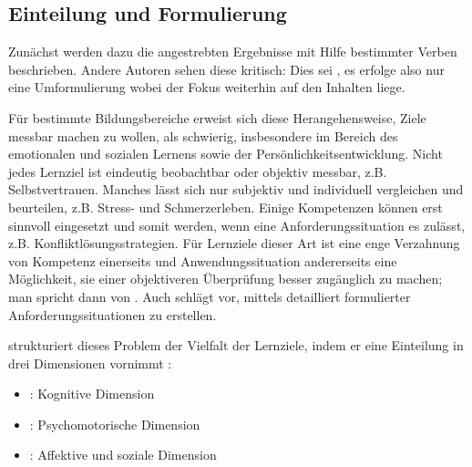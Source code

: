 \documentclass[
  twoside,
  parskip=half-,
  paper=176mm:246mm,
  BCOR=14mm,
  DIV=14,
]{scrreprt}
\begin{document}
\subsection{Einteilung und Formulierung}
Zunächst werden dazu die angestrebten Ergebnisse mit Hilfe bestimmter Verben beschrieben.  Andere Autoren sehen diese  kritisch: Dies sei , es erfolge also nur eine Umformulierung wobei der Fokus weiterhin auf den Inhalten liege.

Für bestimmte Bildungsbereiche erweist sich diese Herangehensweise, Ziele messbar machen zu wollen, als schwierig, insbesondere im Bereich des emotionalen und sozialen Lernens sowie der Persönlichkeitsentwicklung. Nicht jedes Lernziel ist eindeutig beobachtbar oder objektiv messbar, z.B.  Selbstvertrauen. Manches lässt sich nur subjektiv und individuell vergleichen und beurteilen, z.B. Stress- und Schmerzerleben. Einige Kompetenzen können erst sinnvoll eingesetzt und somit  werden, wenn eine Anforderungssituation es zulässt, z.B. Konfliktlösungsstrategien. Für Lernziele dieser Art ist eine enge Verzahnung von Kompetenz einerseits und Anwendungssituation andererseits eine Möglichkeit, sie einer objektiveren Überprüfung besser zugänglich zu machen; man spricht dann von  \autocite[21]{kos}. Auch \citeauthor{arnold} schlägt vor, mittels detailliert formulierter Anforderungssituationen  zu erstellen.

\citeauthor{schlutz} strukturiert dieses Problem der Vielfalt der Lernziele, indem er eine Einteilung in drei Dimensionen vornimmt \autocite[97]{schlutz}:
\begin{itemize}
  \item {}: Kognitive Dimension
  \item {}: Psychomotorische Dimension
  \item {}: Affektive und soziale Dimension
\end{itemize}
\end{document}
